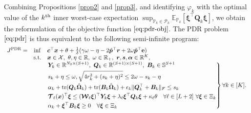 \documentclass{article}
\newcommand{\st}{\textnormal{s.t.}}
\newcommand{\PP}{\mathbb{P}}
\newcommand{\EE}{\mathbb{E}}
\newcommand{\RR}{\mathbb{R}}
\newcommand{\X}{\mathcal{X}}
\newcommand{\tr}{\textup{tr}}
\begin{document}
Combining Propositions \ref{prop2} and  \ref{prop3}, and identifying $\varphi_k$ with the optimal value of the $k^\textup{th}$ inner worst-case expectation $\sup_{\PP_k \in \mathcal{P}_k}  \EE_{\PP_k} [\bm \xi^\top \bm Q_k \bm\xi]$, we obtain the reformulation of the objective function $\eqref{eq:pdr-obj}$. The PDR problem~$\eqref{eq:pdr}$ is thus equivalent to the following semi-infinite program:
\begin{equation}
\label{eq:pdr-ref-1}
\begin{array}{ccll}
J^{\textup{PDR}} = &  \displaystyle \inf & \bm c^\top \bm x + \theta + \frac{1}{\delta} ( \gamma \omega - \eta - 2\hat{\bm p}^\top \bm r + 2\omega\hat{\bm p}^\top \mathbf{e}) \\
& \st & \bm x \in \X, \  \theta, \eta \in \RR,\ \omega \in \RR_{+},\ \bm r, \bm s, \bm \alpha \in \RR^{K}, \\ 
& & \left.
\begin{aligned}
& \bm Y_k \in \RR^{N_2 \times (S+1)},\ \bm Q_k \in \RR^{(S+1) \times (S+1)}, \ \bm B_k \in \mathbb{S}^{S+1} \\
& s_k + \eta \leq \omega, 
\sqrt{4r_k^2 + (s_k +  \eta)^2} \leq 2\omega - s_k -\eta\\
& \alpha_k + \tr(\bm Q_k\hat{\bm\Omega}_k) + \tr(\bm B_k\hat{\bm\Omega}_k) + \epsilon_k\|\bm Q_k^\top +  \bm B_k\|_F \leq s_k  \\
& \bm{\mathcal{T}}_\ell (\bm x)^\top\bm \xi  \leq (\bm{\mathcal{W}}_\ell \bm\xi)^\top\bm Y_k\bm\xi + \lambda_\ell \bm \xi^\top \bm Q_k \bm \xi + \kappa_\ell \theta  \quad \forall \ell \in [L+2] \ \forall \bm\xi \in \Xi_k \\
& \alpha_k + \bm \xi^\top \bm B_k \bm \xi \geq  0  \quad \forall \bm\xi \in \Xi_k  \\
\end{aligned} \right \} \forall k \in [K].
\end{array}
\end{equation}


\end{document}

